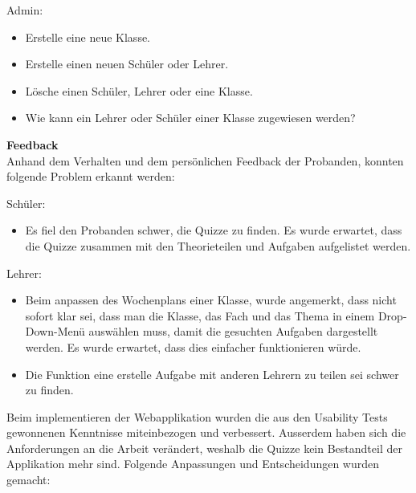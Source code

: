 Admin: \\
\begin{itemize}
	\item Erstelle eine neue Klasse.
	\item Erstelle einen neuen Schüler oder Lehrer.
	\item Lösche einen Schüler, Lehrer oder eine Klasse.
	\item Wie kann ein Lehrer oder Schüler einer Klasse zugewiesen werden?
\end{itemize} 

\textbf{Feedback} \\
Anhand dem Verhalten und dem persönlichen Feedback der Probanden, konnten folgende Problem erkannt werden:

Schüler: \\
\begin{itemize}
	\item Es fiel den Probanden schwer, die Quizze zu finden. Es wurde erwartet, dass die Quizze zusammen mit den Theorieteilen und Aufgaben aufgelistet werden.
\end{itemize}

Lehrer: \\
\begin{itemize}
	\item Beim anpassen des Wochenplans einer Klasse, wurde angemerkt, dass nicht sofort klar sei, dass man die Klasse, das Fach und das Thema in einem Drop-Down-Menü auswählen muss, damit die gesuchten Aufgaben dargestellt werden. Es wurde erwartet, dass dies einfacher funktionieren würde.
	\item Die Funktion eine erstelle Aufgabe mit anderen Lehrern zu teilen sei schwer zu finden.
\end{itemize}

Beim implementieren der Webapplikation wurden die aus den Usability Tests gewonnenen Kenntnisse miteinbezogen und verbessert. Ausserdem haben sich die Anforderungen an die Arbeit verändert, weshalb die Quizze kein Bestandteil der Applikation mehr sind. Folgende Anpassungen und Entscheidungen wurden gemacht: \\


